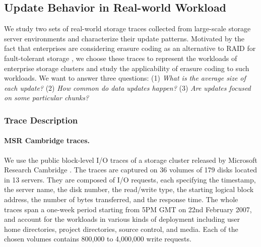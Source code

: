 
\subsection{Update Behavior in Real-world Workload} 
\label{sec:trace}

We study two sets of real-world storage traces collected from large-scale
storage server environments and characterize their update patterns.  Motivated
by the fact that enterprises are considering erasure coding as an alternative
to RAID for fault-tolerant storage \cite{raid_alternatives}, we choose these
traces to represent the workloads of enterprise storage clusters and study the
applicability of erasure coding to such workloads.  We want to answer three
questions: (1) \textit{What is the average size of each update?} (2)
\textit{How common do data updates happen?} (3) \textit{Are updates focused on
some particular chunks?}  


\subsubsection{Trace Description}

\paragraph{MSR Cambridge traces.} We use the public block-level
I/O traces of a storage cluster released by Microsoft Research Cambridge
\cite{narayanan08}. The traces are captured %
on 36 volumes of 179 disks located in 13 servers.  They are composed
of I/O requests, each specifying the timestamp, the server name, the disk
number, the read/write type, the starting logical block address, 
the number of bytes transferred, and the response time.  The whole
traces span a one-week period starting from 5PM GMT on 22nd February 2007, and
account for the workloads in various kinds of deployment including user home
directories, project directories, source control, and media.  
Each of the chosen volumes contains 800,000 to 4,000,000 write requests. 

